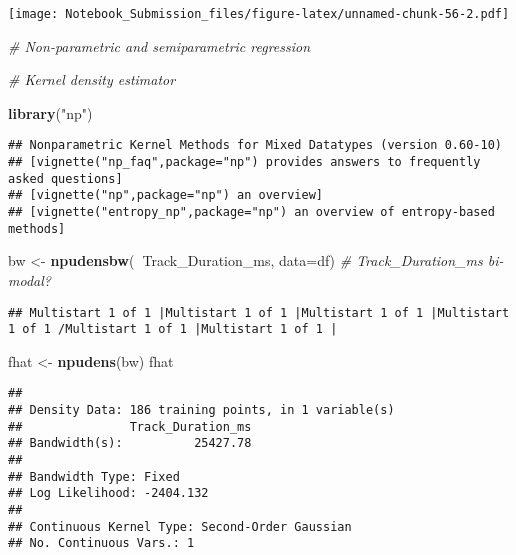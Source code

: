 \documentclass[
]{article}
\newenvironment{Shaded}{\begin{snugshade}}{\end{snugshade}}
\newcommand{\CommentTok}[1]{\textcolor[rgb]{0.56,0.35,0.01}{\textit{#1}}}
\newcommand{\DataTypeTok}[1]{\textcolor[rgb]{0.13,0.29,0.53}{#1}}
\newcommand{\KeywordTok}[1]{\textcolor[rgb]{0.13,0.29,0.53}{\textbf{#1}}}
\newcommand{\NormalTok}[1]{#1}
\newcommand{\OperatorTok}[1]{\textcolor[rgb]{0.81,0.36,0.00}{\textbf{#1}}}
\newcommand{\StringTok}[1]{\textcolor[rgb]{0.31,0.60,0.02}{#1}}
\begin{document}
\texttt{[image: Notebook\_Submission\_files/figure-latex/unnamed-chunk-56-2.pdf]}

\begin{Shaded}
\begin{Highlighting}[]
\CommentTok{# Non-parametric and semiparametric regression}

\CommentTok{# Kernel density estimator}

\KeywordTok{library}\NormalTok{(}\StringTok{"np"}\NormalTok{)}
\end{Highlighting}
\end{Shaded}

\begin{verbatim}
## Nonparametric Kernel Methods for Mixed Datatypes (version 0.60-10)
## [vignette("np_faq",package="np") provides answers to frequently asked questions]
## [vignette("np",package="np") an overview]
## [vignette("entropy_np",package="np") an overview of entropy-based methods]
\end{verbatim}

\begin{Shaded}
\begin{Highlighting}[]
\NormalTok{bw   <-}\StringTok{ }\KeywordTok{npudensbw}\NormalTok{(}\OperatorTok{~}\NormalTok{Track_Duration_ms, }\DataTypeTok{data=}\NormalTok{df) }\CommentTok{# Track_Duration_ms bi-modal?}
\end{Highlighting}
\end{Shaded}

\begin{verbatim}
## Multistart 1 of 1 |Multistart 1 of 1 |Multistart 1 of 1 |Multistart 1 of 1 /Multistart 1 of 1 |Multistart 1 of 1 |                   
\end{verbatim}

\begin{Shaded}
\begin{Highlighting}[]
\NormalTok{fhat <-}\StringTok{ }\KeywordTok{npudens}\NormalTok{(bw)}
\NormalTok{fhat}
\end{Highlighting}
\end{Shaded}

\begin{verbatim}
## 
## Density Data: 186 training points, in 1 variable(s)
##               Track_Duration_ms
## Bandwidth(s):          25427.78
## 
## Bandwidth Type: Fixed
## Log Likelihood: -2404.132
## 
## Continuous Kernel Type: Second-Order Gaussian
## No. Continuous Vars.: 1
\end{verbatim}

\begin{Shaded}
\end{Shaded}
\end{document}

